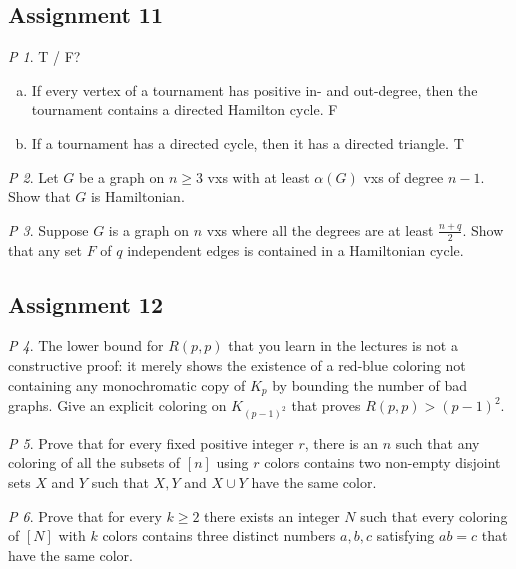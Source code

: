 \documentclass[11pt, fleqn, a4paper, landscape]{article}
\theoremstyle{plain} %
\theoremstyle{remark} %
\newtheorem{problem}{P}
\theoremstyle{definition} %
\begin{document}
\begin{multicols}{5}
\subsection{Assignment 11}

\begin{problem}
T / F?
\begin{enumerate}[(a)]
\item If every vertex of a tournament has positive in- and out-degree, then the tournament contains a directed Hamilton cycle. F
\item If a tournament has a directed cycle, then it has a directed triangle. T
\end{enumerate} 
\end{problem}

\begin{problem}
Let $G$ be a graph on $n \ge 3$ vxs with at least $\alpha(G)$ vxs of degree $n- 1$. Show that $G$ is Hamiltonian.
\end{problem}

\begin{problem}
Suppose $G$ is a graph on $n$ vxs where all the degrees are at least $\frac{n+q}{2}$. Show that any set $F$ of $q$ independent edges is contained in a Hamiltonian cycle.
\end{problem}

\subsection{Assignment 12}

\begin{problem}
The lower bound for $R(p, p)$ that you learn in the lectures is not a constructive proof: it merely shows the existence of a red-blue coloring not containing any monochromatic copy of $K_p$ by bounding the number of bad graphs. Give an explicit coloring on $K_{(p-1)^2}$ that proves $R(p, p) > (p - 1)^2$.
\end{problem}

\begin{problem}
Prove that for every fixed positive integer $r$, there is an $n$ such that any coloring of all the subsets of $[n] $ using $r$ colors contains two non-empty disjoint sets $X$ and $Y$ such that $X, Y $ and $X \cup Y$ have the same color.
\end{problem}

\begin{problem}
Prove that for every $k \ge 2$ there exists an integer $N$ such that every coloring of $[N]$ with $k$ colors contains three distinct numbers $a, b, c$ satisfying $ab = c$ that have the same color.
\end{problem}


\end{multicols}
\end{document}
